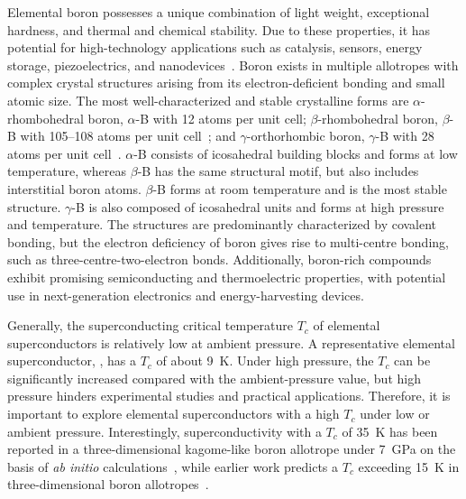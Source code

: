 Elemental boron possesses a unique combination of light weight, exceptional hardness, and thermal and chemical stability.
Due to these properties, it has potential for high-technology applications such as catalysis, sensors, energy storage, piezoelectrics, and nanodevices~\cite{ranjan2024properties}.
Boron exists in multiple allotropes with complex crystal structures arising from its electron-deficient bonding and small atomic size.
The most well-characterized and stable crystalline forms are $\alpha$-rhombohedral boron, $\alpha$-B with 12 atoms per unit cell;
$\beta$-rhombohedral boron, $\beta$-B with 105--108 atoms per unit cell~\cite{widom2008symmetry};
and $\gamma$-orthorhombic boron, $\gamma$-B with 28 atoms per unit cell~\cite{an2016new}.
$\alpha$-B consists of  icosahedral building blocks and forms at low temperature,
whereas $\beta$-B has the same structural motif, but also includes interstitial boron atoms.
$\beta$-B forms at room temperature and is the most stable structure.
$\gamma$-B is also composed of  icosahedral units and forms at high pressure and
temperature.
The structures are predominantly characterized by covalent bonding,
but the electron deficiency of boron gives rise to multi-centre bonding,
such as three-centre-two-electron bonds.
Additionally, boron-rich compounds exhibit promising semiconducting and thermoelectric properties,
with potential use in next-generation electronics and energy-harvesting devices.

Generally, the superconducting critical temperature $T_c$ of elemental superconductors is relatively low at ambient pressure.
A representative elemental superconductor, , has a $T_c$ of about \qty{9}{K}.
Under high pressure, the $T_c$ can be significantly increased compared with the ambient-pressure value,
but high pressure hinders experimental studies and practical applications.
Therefore,
it is important to explore elemental superconductors with a high $T_c$ under low or ambient pressure.
Interestingly, superconductivity with a $T_c$ of \qty{35}{K} has been reported in a three-dimensional kagome-like boron allotrope under \qty{7}{GPa} on the basis of \textit{ab initio} calculations~\cite{ouyang2025superconductivity},
while earlier work predicts a $T_c$ exceeding \qty{15}{K} in three-dimensional boron allotropes~\cite{zhang2020superconducting}.

